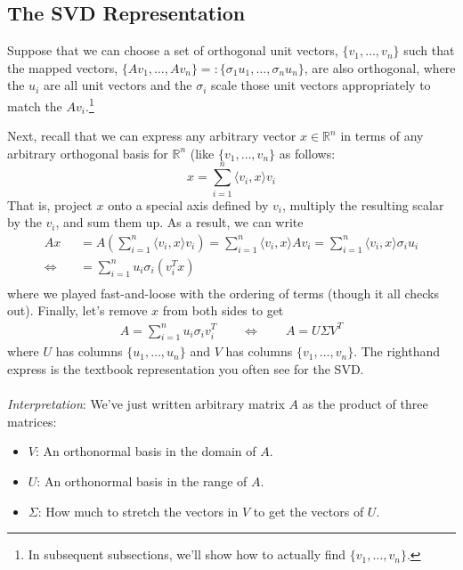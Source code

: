 \documentclass[12pt]{article}
\begin{document}
\subsection{The SVD Representation}

Suppose that we can choose a set of orthogonal unit
vectors, $\{v_1,\ldots,v_n\}$ such that the mapped vectors,
$\{Av_1,\ldots,Av_n\}=:\{\sigma_1 u_1, \ldots, \sigma_n u_n\}$, are also
orthogonal, where the $u_i$ are all unit vectors and the $\sigma_i$
scale those unit vectors appropriately to match the $Av_i$.\footnote{In
subsequent subsections, we'll show how to actually find
$\{v_1,\ldots,v_n\}$.}

Next, recall that we can express any arbitrary vector $x\in\mathbb{R}^n$
in terms of any arbitrary orthogonal basis for $\mathbb{R}^n$ (like
$\{v_1,\ldots,v_n\}$ as follows:
\[
  x = \sum^n_{i=1} \langle v_i, x\rangle v_i
\]
That is, project $x$ onto a special axis defined by $v_i$, multiply the
resulting scalar by the $v_i$, and sum them up. As a result, we can
write 
\begin{align*}
  Ax &= A\left(\sum^n_{i=1} \langle v_i, x\rangle v_i\right)
  = \sum^n_{i=1} \langle v_i, x\rangle A v_i
  = \sum^n_{i=1} \langle v_i, x\rangle \sigma_i u_i\\
  \Leftrightarrow \quad &= \sum^n_{i=1} u_i \sigma_i (v_i^T x)\\
\end{align*}
where we played fast-and-loose with the ordering of terms (though it all
checks out). Finally, let's remove $x$ from both sides to get
\begin{align*}
  A = \sum^n_{i=1} u_i \sigma_i v_i^T 
  \qquad \Leftrightarrow \qquad
  A = U \Sigma V^T
\end{align*}
where $U$ has columns $\{u_1,\ldots,u_n\}$ and $V$ has columns
$\{v_1,\ldots,v_n\}$. The righthand express is the textbook
representation you often see for the SVD.
\\
\\
{\sl Interpretation}: We've just written arbitrary matrix $A$ as the
product of three matrices:
\begin{itemize}
  \item $V$: An orthonormal basis in the domain of $A$.
  \item $U$: An orthonormal basis in the range of $A$.
  \item $\Sigma$: How much to stretch the vectors in $V$ to get the
    vectors of $U$.
\end{itemize}
\end{document}
